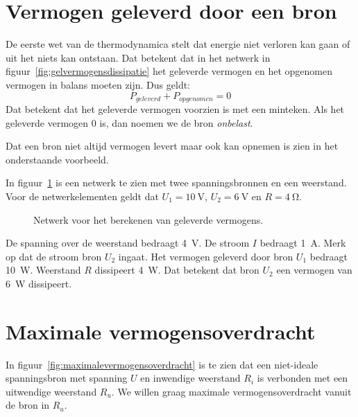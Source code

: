 \section{Vermogen geleverd door een bron}
De eerste wet van de thermodynamica stelt dat energie niet verloren kan gaan of uit het niets kan ontstaan.
Dat betekent dat in het netwerk in figuur~\ref{fig:gelvermogensdissipatie} het geleverde vermogen en het
opgenomen vermogen in balans moeten zijn. Dus geldt:
%
\begin{equation}
P_{geleverd} + P_{opgenomen} = 0
\end{equation}
%
Dat betekent dat het geleverde vermogen voorzien is met een minteken. 
Als het geleverde vermogen 0 is, dan noemen we de bron \textsl{onbelast}.

Dat een bron niet altijd vermogen
levert maar ook kan opnemen is zien in het onderstaande voorbeeld.

\begin{example}
In figuur~\ref{fig:gelgeleverdvermogen} is een netwerk te zien met twee spanningsbronnen en een weerstand.
Voor de netwerkelementen geldt dat $U_1 = \SI{10}{\volt}$, $U_2 = \SI{6}{\volt}$ en $R=\SI{4}{\ohm}$.

\begin{figure}[H]
\centering
{}
\caption{Netwerk voor het berekenen van geleverde vermogens.}
\label{fig:gelgeleverdvermogen}
\end{figure}

De spanning over de weerstand bedraagt \SI{4}{\volt}. De stroom $I$ bedraagt \SI{1}{\ampere}. Merk op dat de stroom bron $U_2$ ingaat. Het vermogen 
geleverd
door bron $U_1$ bedraagt \SI{10}{\watt}. Weerstand $R$ dissipeert \SI{4}{\watt}. Dat betekent dat bron
$U_2$ een vermogen van \SI{6}{\watt} dissipeert.
\end{example}


\section{Maximale vermogensoverdracht}
In figuur~\ref{fig:maximalevermogensoverdracht} is te zien dat een niet-ideale
spanningsbron met spanning $U$ en inwendige weerstand $R_i$ is verbonden met
een uitwendige weerstand $R_u$. We willen graag maximale vermogensoverdracht
vanuit de bron in $R_u$.

